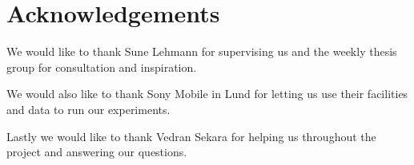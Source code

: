 \chapter{Acknowledgements}
We would like to thank Sune Lehmann for supervising us and the weekly thesis group for consultation and inspiration.

We would also like to thank Sony Mobile in Lund for letting us use their facilities and data to run our experiments.

Lastly we would like to thank Vedran Sekara for helping us throughout the project and answering our questions.


